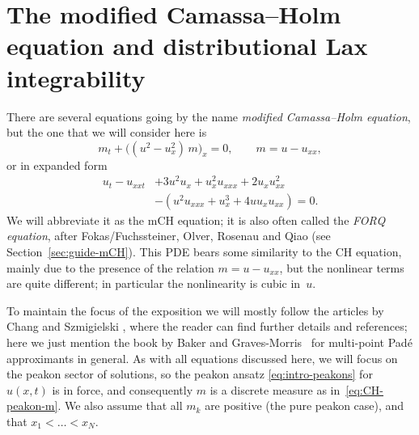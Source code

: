 \documentclass[10pt,a4paper]{article} \pdfoutput=1 
\begin{document}
\section{The modified Camassa--Holm equation and distributional Lax integrability}
\label{sec:mCH}

There are several equations going by the name \emph{modified Camassa--Holm equation},
but the one that we will consider here is
\begin{equation}
  \label{eq:mCH-again}
  m_t + \bigl( (u^2-u_x^2) \, m \bigr)_x = 0
  ,\qquad
  m = u-u_{xx}
  ,
\end{equation}
or in expanded form
\begin{equation}
  \label{eq:mCH-expanded}
  \begin{split}
    u_t - u_{xxt}
    &
    + 3 u^2 u_x  + u_x^2 u_{xxx} + 2 u_x u_{xx}^2
    \\ &
    - ( u^2 u_{xxx} + u_x^3 + 4 u u_x u_{xx} )
    = 0
    .
  \end{split}
\end{equation}
We will abbreviate it as the mCH equation;
it is also often called the \emph{FORQ equation}, after
Fokas/Fuchssteiner, Olver, Rosenau and Qiao
(see Section~\ref{sec:guide-mCH}).
This PDE bears some similarity to the CH equation, mainly due to the presence
of the relation $m=u-u_{xx}$, but the nonlinear terms are quite
different; in particular the nonlinearity is cubic in~$u$.

To maintain the focus of the exposition we will mostly follow
the articles by Chang and Szmigielski
\cite{chang-szmigielski:2016:mCH-concept-of-peakons, chang-szmigielski:2017:mCH-liouville-integrability-conservative-peakons, chang-szmigielski:2018:mCH-Lax-integrability-peakon-problem},
where the reader can find further details and references;
here we just mention the book by
Baker and Graves-Morris~\cite{baker-gravesmorris:1996:pade-approximants}
for multi-point Padé approximants in general.
As with all equations discussed here, we will focus on the peakon sector of solutions,
so the peakon ansatz \eqref{eq:intro-peakons} for $u(x,t)$ is in force, and consequently $m$ is a discrete
measure as in~\eqref{eq:CH-peakon-m}.
We also assume that all $m_k$ are positive (the pure peakon case),
and that $x_1 < \dots < x_N$.
\end{document}
